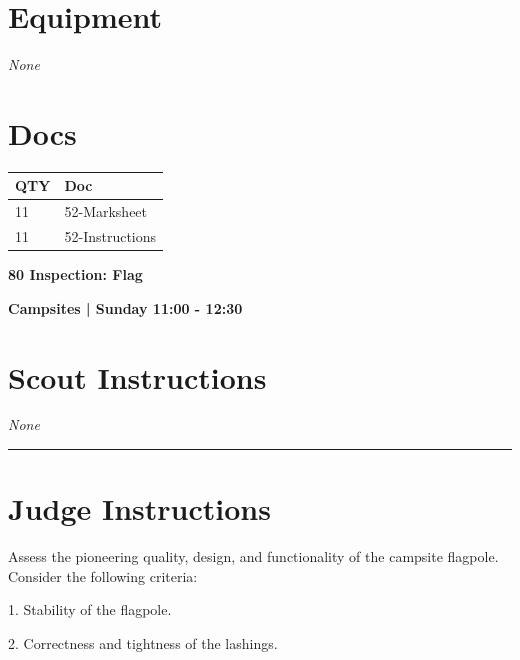 \documentclass[10pt]{article}
\newcommand{\newtitle}[1]{\begin{center}{\Huge\bfseries #1 }\\ \vspace{5mm}\end{center}}
\newcommand{\newsubtitle}[1]{\begin{center}{\color{grey}\Large\bfseries #1 }\\ \vspace{5mm}\end{center}}
\begin{document}
	\begin{multicols}{2}

		\section*{\faWrench \: Equipment}

				\textit{None}
		
		\vfill\null
		\columnbreak

			\section*{\faFile \: Docs}
		 	\begin{center}
			\begin{tabular}{p{2cm}p{4cm}}

			\textbf{QTY} & \textbf{Doc} \\\toprule
										11&52-Marksheet\\\midrule
										11&52-Instructions\\\midrule
							\end{tabular}
			\end{center}
	

		\vfill\null

		\end{multicols}



	\vspace{1cm}


	\clearpage
		\newtitle{80 Inspection: Flag }
	\newsubtitle{Campsites | Sunday 11:00 - 12:30}
		\setcounter{section}{79}
	\section*{Scout Instructions}
		\textit{None}
	
	\vspace{0.5cm}
	\hrule
	\vspace{0.5cm}

		\section*{Judge Instructions}
		Assess the pioneering quality, design, and functionality of the campsite flagpole. Consider the following criteria:



1. Stability of the flagpole.

2. Correctness and tightness of the lashings.
\end{document}

